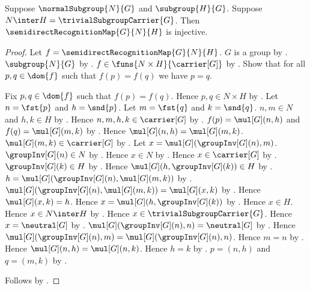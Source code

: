 \begin{theorem}\label{semidirect_recognition_map_injective}
    Suppose $\normalSubgroup{N}{G}$ and $\subgroup{H}{G}$.
    Suppose $N\inter H=\trivialSubgroupCarrier{G}$.
    Then $\semidirectRecognitionMap{G}{N}{H}$ is injective.
\end{theorem}
\begin{proof}
    Let $f=\semidirectRecognitionMap{G}{N}{H}$.
    $G$ is a group by .
    $\subgroup{N}{G}$ by .
    $f\in\funs{N\times H}{\carrier[G]}$ by
        .
    Show that for all $p,q\in\dom{f}$ such that $f(p)=f(q)$ we have
        $p=q$.
    \begin{subproof}
        Fix $p,q\in\dom{f}$ such that $f(p)=f(q)$.
        Hence $p,q\in N\times H$ by .
        Let $n=\fst{p}$ and $h=\snd{p}$.
        Let $m=\fst{q}$ and $k=\snd{q}$.
        $n,m\in N$ and $h,k\in H$ by
            .
        Hence $n,m,h,k\in\carrier[G]$ by
            .
        $f(p)=\mul[G](n,h)$ and $f(q)=\mul[G](m,k)$ by
            .
        Hence $\mul[G](n,h)=\mul[G](m,k)$.
        $\mul[G](m,k)\in\carrier[G]$ by
            .
        Let $x=\mul[G](\groupInv[G](n),m)$.
        $\groupInv[G](n)\in N$ by .
        Hence $x\in N$ by .
        Hence $x\in\carrier[G]$ by
            .
        $\groupInv[G](k)\in H$ by .
        Hence $\mul[G](h,\groupInv[G](k))\in H$ by
            .
        $h=\mul[G](\groupInv[G](n),\mul[G](m,k))$ by
            .
        $\mul[G](\groupInv[G](n),\mul[G](m,k))=
            \mul[G](x,k)$ by
            .
        Hence $\mul[G](x,k)=h$.
        Hence $x=\mul[G](h,\groupInv[G](k))$ by
            .
        Hence $x\in H$.
        Hence $x\in N\inter H$ by .
        Hence $x\in\trivialSubgroupCarrier{G}$.
        Hence $x=\neutral[G]$ by
            .
        $\mul[G](\groupInv[G](n),n)=\neutral[G]$ by
            .
        Hence
            $\mul[G](\groupInv[G](n),m)=
                \mul[G](\groupInv[G](n),n)$.
        Hence $m=n$ by
            .
        Hence $\mul[G](n,h)=\mul[G](n,k)$.
        Hence $h=k$ by .
        $p=(n,h)$ and $q=(m,k)$ by
            .
    \end{subproof}
    Follows by .
\end{proof}

